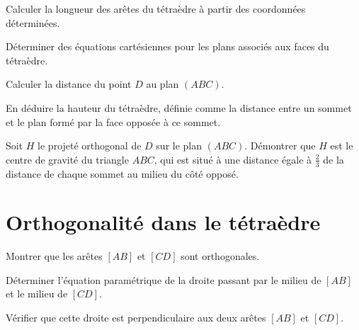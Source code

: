 \documentclass[10pt,a4paper]{article}
\begin{document}
\q Calculer la longueur des arêtes du tétraèdre à partir des coordonnées déterminées.

\q Déterminer des équations cartésiennes pour les plans associés aux faces du tétraèdre.

\q Calculer la distance du point \(D\) au plan \((ABC)\).

\q En déduire la hauteur du tétraèdre, définie comme la distance entre un sommet et le plan
formé par la face opposée à ce sommet.

\q Soit \(H\) le projeté orthogonal de \(D\) sur le plan \((ABC)\). Démontrer que \(H\) est le
centre de gravité du triangle \(ABC\), qui est situé à une distance égale à \(\frac{2}{3}\) de la
distance de chaque sommet au milieu du côté opposé.


\section{Orthogonalité dans le tétraèdre}

\q Montrer que les arêtes \([AB]\) et \([CD]\) sont orthogonales.

\q Déterminer l'équation paramétrique de la droite passant par le milieu de \([AB]\) et le milieu de \([CD]\).

\q Vérifier que cette droite est perpendiculaire aux deux arêtes \([AB]\) et \([CD]\).
\end{document}
